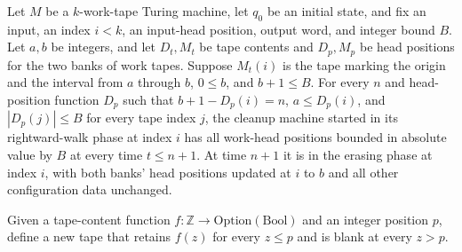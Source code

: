 \begin{lemma}
\label{Complexity.LogProg.goR_run}
\leanok
{}
Let $M$ be a $k$-work-tape Turing machine, let $q_0$ be an initial state, and fix an
input, an index $i<k$, an input-head position, output word, and integer bound $B$. Let
$a,b$ be integers, and let $D_t,M_t$ be tape contents and $D_p,M_p$ be head positions
for the two banks of work tapes. Suppose $M_t(i)$ is the tape marking the origin and the
interval from $a$ through $b$, $0\le b$, and $b+1\le B$. For every $n$ and head-position
function $D_p$ such that $b+1-D_p(i)=n$, $a\le D_p(i)$, and $|D_p(j)|\le B$ for every
tape index $j$, the cleanup machine started in its rightward-walk phase at index $i$ has
all work-head positions bounded in absolute value by $B$ at every time $t\le n+1$. At
time $n+1$ it is in the erasing phase at index $i$, with both banks' head positions
updated at $i$ to $b$ and all other configuration data unchanged.
\end{lemma}

\begin{definition}
\label{Complexity.LogProg.eraseAbove}
\leanok
Given a tape-content function $f:\mathbb Z\to\mathrm{Option}(\mathrm{Bool})$ and an
integer position $p$, define a new tape that retains $f(z)$ for every $z\le p$ and is
blank at every $z>p$.
\end{definition}

